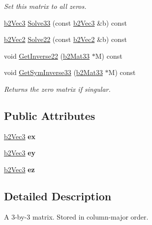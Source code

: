 \begin{DoxyCompactItemize}
\begin{DoxyCompactList}\small\item\em Set this matrix to all zeros. \end{DoxyCompactList}\item 
\hyperlink{structb2_vec3}{b2\-Vec3} \hyperlink{structb2_mat33_a478872c7b6a3bedd13fbedd3ec7a2edb}{Solve33} (const \hyperlink{structb2_vec3}{b2\-Vec3} \&b) const 
\item 
\hyperlink{structb2_vec2}{b2\-Vec2} \hyperlink{structb2_mat33_a2580ac2afadc48028a63ed4c8a1f16bc}{Solve22} (const \hyperlink{structb2_vec2}{b2\-Vec2} \&b) const 
\item 
void \hyperlink{structb2_mat33_a9eb5090b15d08ab495458adfec50e7cb}{Get\-Inverse22} (\hyperlink{structb2_mat33}{b2\-Mat33} $\ast$M) const 
\item 
void \hyperlink{structb2_mat33_a501f85edde8f080e4e9ecff0ec2ee27e}{Get\-Sym\-Inverse33} (\hyperlink{structb2_mat33}{b2\-Mat33} $\ast$M) const 
\begin{DoxyCompactList}\small\item\em Returns the zero matrix if singular. \end{DoxyCompactList}\end{DoxyCompactItemize}
\subsection*{Public Attributes}
\begin{DoxyCompactItemize}
\item 
\hypertarget{structb2_mat33_a132f00e6550d1e19c75fb60ce1229638}{\hyperlink{structb2_vec3}{b2\-Vec3} {\bfseries ex}}\label{structb2_mat33_a132f00e6550d1e19c75fb60ce1229638}

\item 
\hypertarget{structb2_mat33_ababc69c718c73a04a651f7a6a981ecf4}{\hyperlink{structb2_vec3}{b2\-Vec3} {\bfseries ey}}\label{structb2_mat33_ababc69c718c73a04a651f7a6a981ecf4}

\item 
\hypertarget{structb2_mat33_ae700fc46f679b4ef211a2517005b0557}{\hyperlink{structb2_vec3}{b2\-Vec3} {\bfseries ez}}\label{structb2_mat33_ae700fc46f679b4ef211a2517005b0557}

\end{DoxyCompactItemize}


\subsection{Detailed Description}
A 3-\/by-\/3 matrix. Stored in column-\/major order. 

